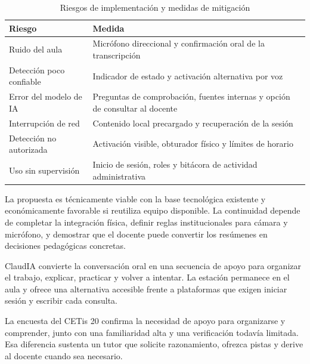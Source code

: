 \documentclass[11pt]{article}
\newcommand{\Section}[1]{\par\vspace{0.16\baselineskip}{\normalfont\normalsize\bfseries\RaggedRight #1\par}}
\newcommand{\Subsection}[1]{\par\vspace{0.12\baselineskip}{\normalfont\normalsize\bfseries\RaggedRight #1\par\vspace{0.07\baselineskip}}}
\begin{document}
\begin{table}[H]
\centering
\caption{Riesgos de implementación y medidas de mitigación}
\small
\begin{tabularx}{\textwidth}{@{}>{\raggedright\arraybackslash}p{1.45in}>{\raggedright\arraybackslash}X@{}}
\toprule
\textbf{Riesgo} & \textbf{Medida} \\
\midrule
Ruido del aula & Micrófono direccional y confirmación oral de la transcripción \\
Detección poco confiable & Indicador de estado y activación alternativa por voz \\
Error del modelo de IA & Preguntas de comprobación, fuentes internas y opción de consultar al docente \\
Interrupción de red & Contenido local precargado y recuperación de la sesión \\
Detección no autorizada & Activación visible, obturador físico y límites de horario \\
Uso sin supervisión & Inicio de sesión, roles y bitácora de actividad administrativa \\
\bottomrule
\end{tabularx}
\end{table}

\Subsection{Decisión de viabilidad}
La propuesta es técnicamente viable con la base tecnológica existente y económicamente favorable si reutiliza equipo disponible. La continuidad depende de completar la integración física, definir reglas institucionales para cámara y micrófono, y demostrar que el docente puede convertir los resúmenes en decisiones pedagógicas concretas.

\clearpage

\Section{Conclusión y trabajo futuro}

ClaudIA convierte la conversación oral en una secuencia de apoyo para organizar el trabajo, explicar, practicar y volver a intentar. La estación permanece en el aula y ofrece una alternativa accesible frente a plataformas que exigen iniciar sesión y escribir cada consulta.

La encuesta del CETis 20 confirma la necesidad de apoyo para organizarse y comprender, junto con una familiaridad alta y una verificación todavía limitada. Esa diferencia sustenta un tutor que solicite razonamiento, ofrezca pistas y derive al docente cuando sea necesario.
\end{document}
